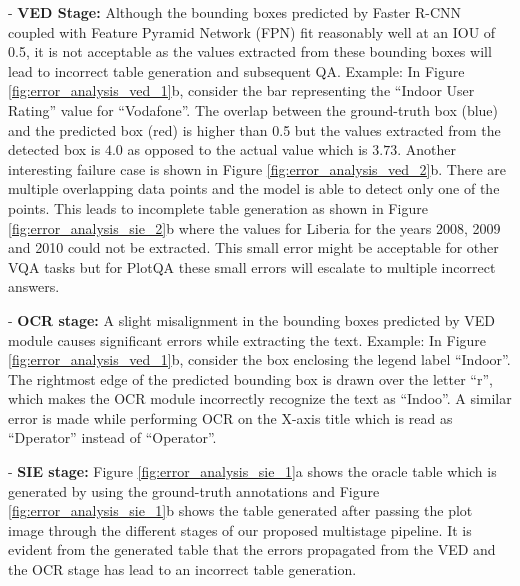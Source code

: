 \documentclass[10pt,twocolumn,letterpaper]{article}
\begin{document}
- \textbf{VED Stage:} Although the bounding boxes predicted by Faster R-CNN coupled with Feature Pyramid Network (FPN) fit reasonably well at an IOU of 0.5, it is not acceptable as the values extracted from these bounding boxes will lead to incorrect table generation and subsequent QA. Example: In Figure \ref{fig:error_analysis_ved_1}b, consider the bar representing the ``Indoor User Rating'' value for ``Vodafone''. The overlap between the ground-truth box (blue) and the predicted box (red) is higher than 0.5 but the values extracted from the detected box is $4.0$ as opposed to the actual value which is $3.73$. Another interesting failure case is shown in Figure \ref{fig:error_analysis_ved_2}b. There are multiple overlapping data points and the model is able to detect only one of the points. This leads to incomplete table generation as shown in Figure \ref{fig:error_analysis_sie_2}b where the values for Liberia for the years 2008, 2009 and 2010 could not be extracted. This small error might be acceptable for other VQA tasks but for PlotQA these small errors will escalate to multiple incorrect answers.

- \textbf{OCR stage:}
A slight misalignment in the bounding boxes predicted by VED module causes significant errors while extracting the text.
Example: In Figure \ref{fig:error_analysis_ved_1}b, consider the box enclosing the legend label ``Indoor''. The rightmost edge of the predicted bounding box is drawn over the letter ``r'', which makes the OCR module incorrectly recognize the text as ``Indoo''. A similar error is made while performing OCR on the X-axis title which is read as ``Dperator'' instead of ``Operator''. 

- \textbf{SIE stage:} Figure \ref{fig:error_analysis_sie_1}a shows the oracle table which is generated by using the ground-truth annotations and Figure \ref{fig:error_analysis_sie_1}b shows the table generated after passing the plot image through the different stages of our proposed multistage pipeline. It is evident from the generated table that the errors propagated from the VED and the OCR stage has lead to an incorrect table generation.
\end{document}
